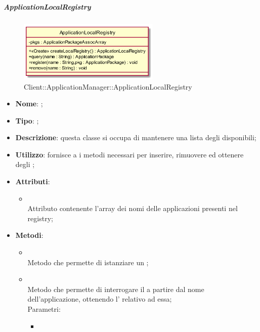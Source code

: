 \hypertarget{ApplicationLocalRegistry_label}{\subparagraph{ApplicationLocalRegistry}}
\begin{figure}[h]
	\centering
	\includegraphics[width=0.60\textwidth,height=\textheight,keepaspectratio]{images/ClassApplicationLocalRegistry.png}
	\caption{Client::ApplicationManager::ApplicationLocalRegistry}
\end{figure}
\begin{itemize}
	\item \textbf{Nome}: ;
	\item \textbf{Tipo}: ;
	\item \textbf{Descrizione}: questa classe si occupa di mantenere una lista degli  disponibili;
	\item \textbf{Utilizzo}: fornisce a  i metodi necessari per inserire, rimuovere ed ottenere degli ;
	\item \textbf{Attributi}:
	\begin{itemize}
		\item[]  \\
		Attributo contenente l'array dei nomi delle applicazioni presenti nel registry;
	\end{itemize}
	\item \textbf{Metodi}:
	\begin{itemize}
		\item[]  \\		Metodo che permette di istanziare un ;\\
		\item[]  \\		Metodo che permette di interrogare il  a partire dal nome dell'applicazione, ottenendo l'  relativo ad essa;\\
		Parametri:
		\begin{itemize}
			\item {} \\

\end{itemize}
\end{itemize}
\end{itemize}
